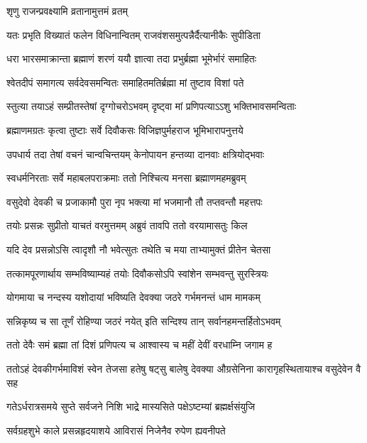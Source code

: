 \onelineshloka
{शृणु राजन्प्रवक्ष्यामि व्रतानामुत्तमं व्रतम्}%

\twolineshloka
{यतः प्रभृति विख्यातं फलेन विधिनान्वितम्}
{राजवंशसमुत्पन्नैर्दैत्यानीकैः सुपीडिता}%

\twolineshloka
{धरा भारसमाक्रान्ता ब्रह्माणं शरणं ययौ}
{ज्ञात्वा तदा प्रभुर्ब्रह्मा भूमेर्भारं समाहितः}%

\twolineshloka
{श्वेतदीपं समागत्य सर्वदेवसमन्वितः}
{समाहितमतिर्ब्रह्मा मां तुष्टाव विशां पते}%

\twolineshloka
{स्तुत्या तयाऽहं सम्प्रीतस्तेषां दृग्गोचरोऽभवम्}
{दृष्ट्वा मां प्रणिपत्याऽऽशु भक्तिभावसमन्विताः}%

\twolineshloka
{ब्रह्माणमग्रतः कृत्वा तुष्टाः सर्वे दिवौकसः}
{विजिज्ञपुर्महराज भूमिभारापनुत्तये}%

\twolineshloka
{उपधार्य तदा तेषां वचनं चान्वचिन्तयम्}
{केनोपायन हन्तव्या दानवाः क्षत्रियोद्भवाः}%

\twolineshloka
{स्वधर्मनिरताः सर्वे महाबलपराक्रमाः}
{ततो निश्चित्य मनसा ब्रह्माणमहमब्रुवम्}%

\twolineshloka
{वसुदेवो देवकी च प्रजाकामौ पुरा नृप}
{भक्त्या मां भजमानौ तौ तप्तवन्तौ महत्तपः}%

\twolineshloka
{तयोः प्रसन्नः सुप्रीतो याचतं वरमुत्तमम्}
{अब्रुवं तावपि ततो वरयामासतुः किल}%

\twolineshloka
{यदि देव प्रसन्नोऽसि त्वादृशौ नौ भवेत्सुतः}
{तथेति च मया ताभ्यामुक्तं प्रीतेन चेतसा}%

\twolineshloka
{तत्कामपूरणार्थाय सम्भविष्याम्यहं तयोः}
{दिवौकसोऽपि स्वांशेन सम्भवन्तु सुरस्त्रियः}%

\twolineshloka
{योगमाया च नन्दस्य यशोदायां भविष्यति}
{देवक्या जठरे गर्भमनन्तं धाम मामकम्}%

\twolineshloka
{सन्निकृष्य च सा तूर्णं रोहिण्या जठरं नयेत्}
{इति सन्दिश्य तान् सर्वानहमन्तर्हितोऽभवम्}%

\twolineshloka
{ततो देवैः समं ब्रह्मा तां दिशं प्रणिपत्य च}
{आश्वास्य च महीं देवीं वरधाम्नि जगाम ह}%

\threelineshloka
{ततोऽहं देवकीगर्भमाविशं स्वेन तेजसा}
{हतेषु षट्सु बालेषु देवक्या औग्रसेनिना}
{कारागृहस्थितायाश्च वसुदेवेन वै सह}%

\twolineshloka
{गतेऽर्धरात्रसमये सुप्ते सर्वजने निशि}
{भाद्रे मास्यसिते पक्षेऽष्टम्यां ब्रह्मर्क्षसंयुजि}%

\twolineshloka
{सर्वग्रहशुभे काले प्रसन्नहृदयाशये}
{आविरासं निजेनैव रुपेण ह्यवनीपते}%

